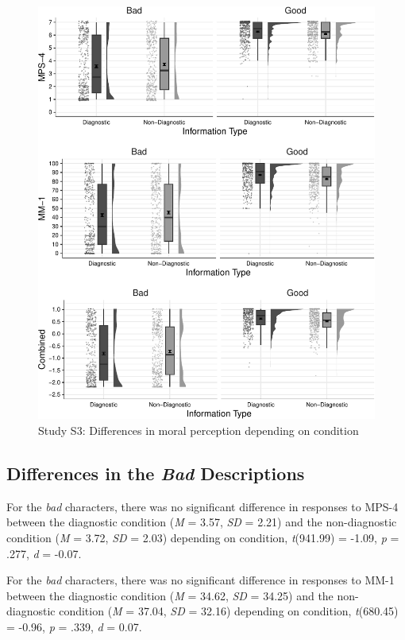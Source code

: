 \documentclass[
  man,floatsintext]{apa6}
\begin{document}
\begin{figure}[!h]
\includegraphics[width=\textwidth,]{Supplementary_files/figure-latex/StudyS3bothconditionplot-1} \caption{Study S3: Differences in moral perception depending on condition}\label{fig:StudyS3bothconditionplot}
\end{figure}

\subsection{\texorpdfstring{Differences in the \emph{Bad} Descriptions}{Differences in the Bad Descriptions}}\label{differences-in-the-bad-descriptions-1}

For the \emph{bad} characters, there was no significant difference in responses to MPS-4 between the diagnostic condition (\emph{M} = 3.57, \emph{SD} = 2.21) and the non-diagnostic condition (\emph{M} = 3.72, \emph{SD} = 2.03) depending on condition, \emph{t}(941.99) = -1.09, \emph{p} = .277, \emph{d} = -0.07.

For the \emph{bad} characters, there was no significant difference in responses to MM-1 between the diagnostic condition (\emph{M} = 34.62, \emph{SD} = 34.25) and the non-diagnostic condition (\emph{M} = 37.04, \emph{SD} = 32.16) depending on condition, \emph{t}(680.45) = -0.96, \emph{p} = .339, \emph{d} = 0.07.
\end{document}
